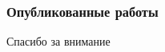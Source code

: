 \documentclass[10pt,pdf,hyperref={unicode},aspectratio=169]{beamer}
\theoremstyle{definition}
\begin{document}
\begin{frame}
	\frametitle{Опубликованные работы}
	\printbibliography{}
\end{frame}


\begin{frame}
	\huge\centering
	Спасибо за внимание
\end{frame}


\end{document}
